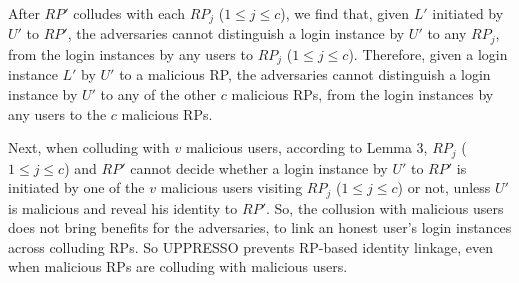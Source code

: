After $RP'$ colludes with each $RP_j$ ($1 \leq j \leq c$),  we find that, given $L'$ initiated by $U'$ to $RP'$, the adversaries cannot distinguish a login instance by $U'$ to any $RP_j$, from the login instances by any users to $RP_j$ ($1 \leq j \leq c$).
Therefore, given a login instance $L'$ by $U'$ to a malicious RP, the adversaries cannot distinguish a login instance by $U'$ to any of the other $c$ malicious RPs, from the login instances by any users to the $c$ malicious RPs.

Next, when colluding with $v$ malicious users, according to Lemma 3, $RP_j$ ($1 \leq j \leq c$) and $RP'$ cannot decide whether a login instance by $U'$ to $RP'$ is initiated by one of the $v$ malicious users visiting $RP_j$ ($1 \leq j \leq c$) or not, unless $U'$ is malicious and reveal his identity to $RP'$.
So, the collusion with malicious users does not bring benefits for the adversaries, to link an honest user's login instances across colluding RPs. So UPPRESSO prevents RP-based identity linkage, even when malicious RPs are colluding with malicious users.




